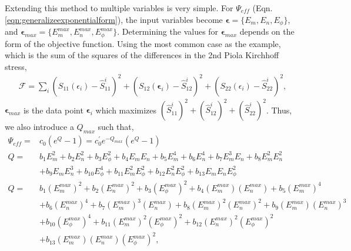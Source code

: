 	Extending this method to multiple variables is very simple. For $\Psi_{eff}$ (Eqn. \ref{eqn:generalizeexponentialform}), the input variables become $\mathbf{\epsilon} = \{E_m, E_n, E_\phi\}$, and $\mathbf{\epsilon}_{max} = \{E_m^{max},E_n^{max},E_\phi^{max}\}$. Determining the values for $\mathbf{\epsilon}_{max}$ depends on the form of the objective function. Using the most common case as the example, which is the sum of the squares of the differences in the 2nd Piola Kirchhoff stress,
\begin{equation}
\begin{aligned}
\mathcal{F} = \sum_i \left(S_{11}(\epsilon_i) - \hat{S}_{11}^i\right)^2 + \left(S_{12}(\mathbf{\epsilon}_i) - \hat{S}_{12}^i\right)^2 + \left(S_{22}(\epsilon_i) - \hat{S}_{22}^i\right)^2,
\end{aligned}
\end{equation}
$\mathbf{\epsilon}_{max}$ is the data point $\mathbf{\epsilon}_i$ which maximizes $\left(\hat{S}_{11}^i\right)^2 + \left(\hat{S}_{12}^i\right)^2 + \left(\hat{S}_{22}^i\right)^2$. 
Thus, we also introduce a $Q_{max}$ such that,
\begin{equation} \label{eqn:finalexponentialmodelformscaled}
\begin{aligned}
\Psi_{eff} 	=& c_0 \left(e^{Q} - 1\right) = c_0^\prime e^{-Q_{max}}\left(e^{Q} - 1\right)    \\
Q		=& b_1 E_m^2 + b_2 E_n^2 + b_3 E_\phi^2 + b_4 E_m E_n + b_5 E_m^4 + b_6 E_n^4 + b_7 E_m^3 E_n + b_8 E_m^2 E_n^2 \\ 
&+ b_9 E_m E_n^3 + b_{10} E_\phi^4 + b_{11} E_m^2E_\phi^2 + b_{12} E_n^2 E_\phi^2 + b_{13} E_m E_n E_\phi^2 \\
Q		=& b_1 (E_m^{max})^2 + b_2 (E_n^{max})^2 + b_3 (E_\phi^{max})^2 + b_4 (E_m^{max}) (E_n^{max}) + b_5 (E_m^{max})^4   \\
    &+ b_6 (E_n^{max})^4 + b_7 (E_m^{max})^3 (E_n^{max}) + b_8 (E_m^{max})^2 (E_n^{max})^2 + b_9 (E_m^{max}) (E_n^{max})^3	\\
	&+ b_{10} (E_\phi^{max})^4 + b_{11} (E_m^{max})^2(E_\phi^{max})^2 + b_{12} (E_n^{max})^2 (E_\phi^{max})^2    \\ 
	&+ b_{13} (E_m^{max}) (E_n^{max}) (E_\phi^{max})^2,
\end{aligned}
\end{equation}
